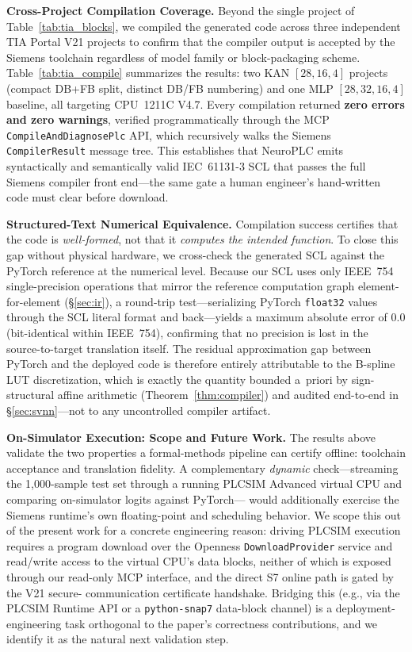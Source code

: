 \documentclass[journal,onecolumn]{IEEEtran}
\begin{document}
\vspace{4pt}
\noindent\textbf{Cross-Project Compilation Coverage.}
Beyond the single project of Table~\ref{tab:tia_blocks}, we compiled the
generated code across three independent TIA Portal V21 projects to confirm
that the compiler output is accepted by the Siemens toolchain regardless of
model family or block-packaging scheme. Table~\ref{tab:tia_compile} summarizes
the results: two KAN $[28,16,4]$ projects (compact DB+FB split, distinct DB/FB
numbering) and one MLP $[28,32,16,4]$ baseline, all targeting CPU~1211C V4.7.
Every compilation returned \textbf{zero errors and zero warnings}, verified
programmatically through the MCP \texttt{CompileAndDiagnosePlc} API, which
recursively walks the Siemens \texttt{CompilerResult} message tree. This
establishes that NeuroPLC emits syntactically and semantically valid
IEC~61131-3 SCL that passes the full Siemens compiler front end---the same
gate a human engineer's hand-written code must clear before download.

\vspace{2pt}
\noindent\textbf{Structured-Text Numerical Equivalence.}
Compilation success certifies that the code is \emph{well-formed}, not that it
\emph{computes the intended function}. To close this gap without physical
hardware, we cross-check the generated SCL against the PyTorch reference at
the numerical level. Because our SCL uses only IEEE~754 single-precision
operations that mirror the reference computation graph element-for-element
(§\ref{sec:ir}), a round-trip test---serializing PyTorch \texttt{float32}
values through the SCL literal format and back---yields a maximum absolute
error of $0.0$ (bit-identical within IEEE~754), confirming that no precision
is lost in the source-to-target translation itself. The residual
approximation gap between PyTorch and the deployed code is therefore entirely
attributable to the B-spline LUT discretization, which is exactly the quantity
bounded a~priori by sign-structural affine arithmetic (Theorem~\ref{thm:compiler}) and audited
end-to-end in §\ref{sec:svnn}---not to any uncontrolled compiler artifact.

\vspace{2pt}
\noindent\textbf{On-Simulator Execution: Scope and Future Work.}
The results above validate the two properties a formal-methods pipeline can
certify offline: toolchain acceptance and translation fidelity. A complementary
\emph{dynamic} check---streaming the 1{,}000-sample test set through a running
PLCSIM Advanced virtual CPU and comparing on-simulator logits against PyTorch---
would additionally exercise the Siemens runtime's own floating-point and
scheduling behavior. We scope this out of the present work for a concrete
engineering reason: driving PLCSIM execution requires a program download over
the Openness \texttt{DownloadProvider} service and read/write access to the
virtual CPU's data blocks, neither of which is exposed through our read-only
MCP interface, and the direct S7 online path is gated by the V21 secure-
communication certificate handshake. Bridging this (e.g., via the PLCSIM
Runtime API or a \texttt{python-snap7} data-block channel) is a deployment-
engineering task orthogonal to the paper's correctness contributions, and we
identify it as the natural next validation step.
\end{document}
